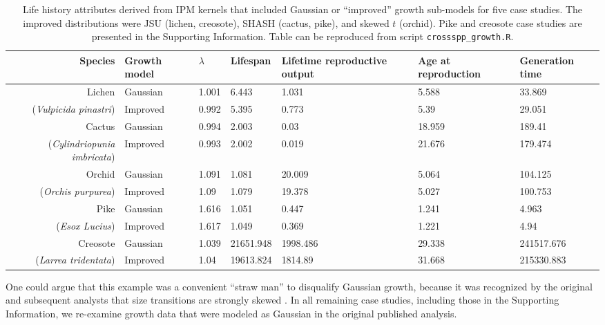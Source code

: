 \documentclass[12pt]{article}
\begin{document}
\begin{spacing}{1.9}
\begin{table}[tbp]
\renewcommand{\arraystretch}{1.5}
	\caption{Life history attributes derived from IPM kernels that included Gaussian or ``improved'' growth sub-models for five case studies. The improved distributions were JSU (lichen, creosote), SHASH (cactus, pike), and skewed $t$ (orchid). Pike and creosote case studies are presented in the Supporting Information. Table can be reproduced from script \texttt{crossspp\_growth.R}.}
	\centering
	\begingroup\fontsize{10pt}{11pt}\selectfont
	\begin{tabular}{rp{1.5cm}|p{1.5cm}p{1.5cm}p{1.5cm}p{1.5cm}p{1.5cm}}
	{\textbf{Species}} & {\textbf{Growth model}} & {\textbf{$\lambda$}} & {\textbf{Lifespan}} & {\textbf{Lifetime reproductive output}} & {\textbf{Age at reproduction}} & {\textbf{Generation time}} \\ 
	\hline
	Lichen & Gaussian & 1.001 & 6.443 & 1.031 & 5.588 & 33.869 \\ 
	(\textit{Vulpicida pinastri}) & Improved & 0.992 & 5.395 & 0.773 & 5.39 & 29.051 \\ 
	\hline
	Cactus & Gaussian & 0.994 & 2.003 & 0.03 & 18.959 & 189.41 \\ 
	(\textit{Cylindriopunia imbricata}) & Improved & 0.993 & 2.002 & 0.019 & 21.676 & 179.474 \\ 
	\hline
	Orchid & Gaussian & 1.091 & 1.081 & 20.009 & 5.064 & 104.125 \\ 
	(\textit{Orchis purpurea}) & Improved & 1.09 & 1.079 & 19.378 & 5.027 & 100.753 \\ 
	\hline
	Pike & Gaussian & 1.616 & 1.051 & 0.447 & 1.241 & 4.963 \\ 
	(\textit{Esox Lucius}) & Improved & 1.617 & 1.049 & 0.369 & 1.221 & 4.94 \\ 
	\hline
	Creosote & Gaussian & 1.039 & 21651.948 & 1998.486 & 29.338 & 241517.676 \\ 
	(\textit{Larrea tridentata}) & Improved & 1.04 & 19613.824 & 1814.89 & 31.668 & 215330.883 \\ 
	\hline 
	\end{tabular}
	\endgroup
	\label{tab:crossspp}
\end{table}

One could argue that this example was a convenient ``straw man'' to disqualify Gaussian growth, because it was recognized by the original and subsequent analysts that size transitions are strongly skewed \citep{shriver2012comparative,peterson2019improving}. 
In all remaining case studies, including those in the Supporting Information, we re-examine growth data that were modeled as Gaussian in the original published analysis.  


\end{spacing}
\end{document}
